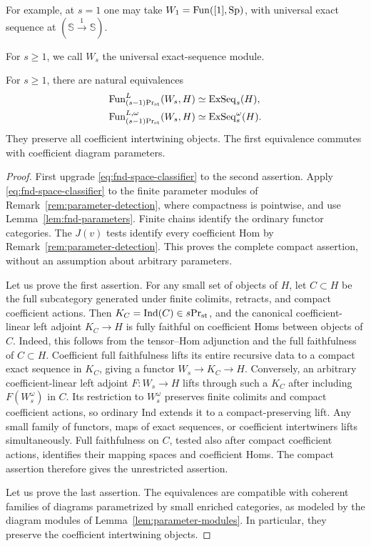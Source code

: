 For example, at $s=1$ one may take $W_1=\operatorname{Fun}([1],\mathrm{Sp})$, with universal exact sequence
at $(\mathbb S\xrightarrow1\mathbb S)$.

\begin{definition}
For \(s\ge 1\), we call \(W_s\) the universal exact-sequence module.
\end{definition}


\begin{corollary}\label{cor:presentable-exact-classifier}
For \(s\ge1\), there are natural equivalences
\begin{align}
 \operatorname{Fun}^L_{{(s-1)}\mathrm{Pr}_{\mathrm{st}}}(W_s,H)
 &\simeq\operatorname{ExSeq}_s(H),\label{eq:presentable-exact-classifier}\\
 \operatorname{Fun}^{L,\omega}_{{(s-1)}\mathrm{Pr}_{\mathrm{st}}}(W_s,H)
 &\simeq\operatorname{ExSeq}_s^\omega(H).\label{eq:compact-exact-classifier}
\end{align}
They preserve all coefficient intertwining objects. The first
equivalence commutes with coefficient diagram parameters.
\end{corollary}

\begin{proof}
First upgrade \eqref{eq:fnd-space-classifier} to the second
assertion. Apply \eqref{eq:fnd-space-classifier} to the finite
parameter modules of Remark~\ref{rem:parameter-detection}, where
compactness is pointwise, and use
Lemma~\ref{lem:fnd-parameters}. Finite chains identify the ordinary
functor categories. The $J(v)$ tests identify every coefficient Hom
by Remark~\ref{rem:parameter-detection}. This proves the complete
compact assertion, without an assumption about arbitrary parameters.


Let us prove the first assertion.
For any small set of objects of $H$, let $C\subset H$
be the full subcategory generated under finite colimits,
retracts, and compact coefficient actions.
Then $K_C=\operatorname{Ind}(C)\in{s}\mathrm{Pr}_{\mathrm{st}}$, and the canonical
coefficient-linear left adjoint $K_C\to H$ is
fully faithful on coefficient Homs between objects of $C$.
Indeed, this follows from the tensor--Hom adjunction
and the full faithfulness of $C\subset H$.
Coefficient full faithfulness lifts its entire
recursive data to a compact exact sequence in $K_C$, giving a functor
$W_s\to K_C\to H$. Conversely, an arbitrary coefficient-linear
left adjoint $F:W_s\to H$ lifts through such a $K_C$ after including
$F(W_s^\omega)$ in $C$. Its restriction to $W_s^\omega$ preserves
finite colimits and compact coefficient actions, so ordinary Ind
extends it to a compact-preserving lift. Any small family of
functors, maps of exact sequences, or coefficient intertwiners lifts simultaneously.
Full faithfulness on $C$, tested also after compact coefficient
actions, identifies their mapping spaces and coefficient Homs.
The compact assertion therefore gives the unrestricted assertion.

Let us prove the last assertion.
The equivalences are compatible with coherent families
of diagrams parametrized by small enriched categories,
as modeled by the diagram modules of
Lemma~\ref{lem:parameter-modules}.
In particular, they preserve the coefficient
intertwining objects.
\end{proof}


